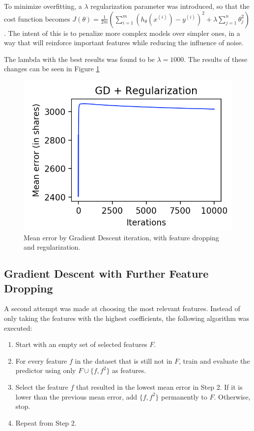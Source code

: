 \documentclass[10pt,twocolumn,letterpaper]{article}
\begin{document}
To minimize overfitting, a $\lambda$ regularization parameter was introduced, so that the cost function becomes $J(\theta) = \frac{1}{2m}(\sum_{i=1}^{m}(h_\theta(x^{(i)}) - y^{(i)})^2 + \lambda\sum_{j=1}^{n}\theta_{j}^{2})$. The intent of this is to penalize more complex models over simpler ones, in a way that will reinforce important features while reducing the influence of noise.

The lambda with the best results was found to be $\lambda = 1000$. The results of these changes can be seen in Figure \ref{fig:gd3}

\begin{figure}
\begin{center}
	\includegraphics[width=0.99\columnwidth]{pics/gd3.png}
	\caption{Mean error by Gradient Descent iteration, with feature dropping and regularization.\label{fig:gd3}}   
\end{center} 
\end{figure}

\subsection{Gradient Descent with Further Feature Dropping}
\label{sec:gdrfd}

A second attempt was made at choosing the most relevant features. Instead of only taking the features with the highest coefficients, the following algorithm was executed:

\begin{enumerate}
    \item Start with an empty set of selected features $F$.
    \item For every feature $f$ in the dataset that is still not in $F$, train and evaluate the predictor using only $F \cup \{f, f^2\}$ as features.
    \item Select the feature $f$ that resulted in the lowest mean error in Step 2. If it is lower than the previous mean error, add $\{f, f^2\}$ permanently to $F$. Otherwise, stop.
    \item Repeat from Step 2.
\end{enumerate}
\end{document}

